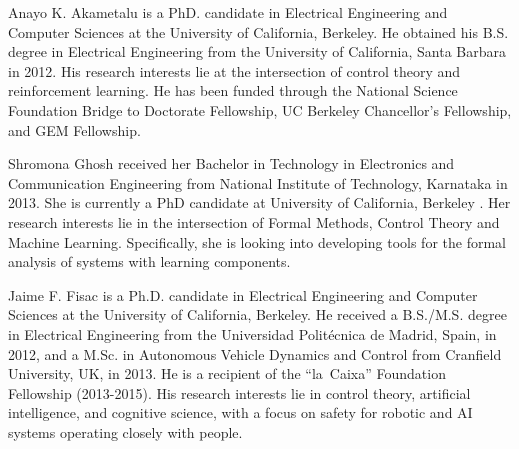 

\begin{IEEEbiography}{Anayo K. Akametalu} is a PhD. candidate in Electrical Engineering and Computer Sciences at the University of California, Berkeley. He obtained his B.S. degree in Electrical Engineering from the University of California, Santa Barbara in 2012. His research interests lie at the intersection of control theory and reinforcement learning. He has been funded through the National Science Foundation Bridge to Doctorate Fellowship, UC Berkeley Chancellor's Fellowship, and GEM Fellowship.
\end{IEEEbiography}
\vspace{-3cm}
\begin{IEEEbiography}{Shromona Ghosh} received her Bachelor in Technology in Electronics and Communication Engineering from National Institute of Technology, Karnataka in 2013. She is currently a PhD candidate at University of California, Berkeley . Her research interests lie in the intersection of Formal Methods, Control Theory and Machine Learning. Specifically, she is looking into developing tools for the formal analysis of systems with learning components. 
\end{IEEEbiography}
\vspace{-3cm}
\begin{IEEEbiography}{Jaime F. Fisac} is a Ph.D. candidate in Electrical Engineering and Computer Sciences at the University of California, Berkeley. He received a B.S./M.S. degree in Electrical Engineering from the Universidad Polit{\'e}cnica de Madrid, Spain, in 2012, and a M.Sc. in Autonomous Vehicle Dynamics and Control from Cranfield University, UK, in 2013. He is a recipient of the ``la~Caixa'' Foundation Fellowship (2013-2015). His research interests lie in control theory, artificial intelligence, and cognitive science, with a focus on safety for robotic and AI systems operating closely with people.
\end{IEEEbiography}
